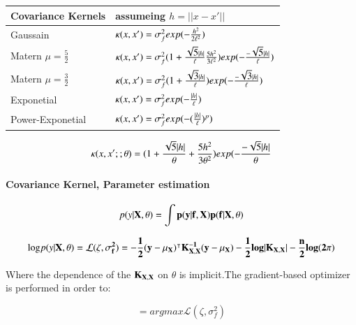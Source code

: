 \documentclass[]{elsarticle} %
\begin{document}
\begin{tabu} to 
\toprule
Covariance Kernels & assumeing $h=||x-x'||$\\
\midrule
Gaussain & $\Large \kappa (x,x') =\sigma_f^2 exp(-\frac{h^2}{2\ell^2})$\\
Matern $\mu=\frac{5}{2}$ & $\Large \kappa (x,x') =\sigma_f^2(1 + \frac{\sqrt{5}|h|}{\ell}\frac{5h^2}{3\ell^2})exp(-\frac{ -\sqrt{5}|h|}{\ell})$\\
Matern $\mu=\frac{3}{2}$ & $\Large \kappa (x,x') =\sigma_f^2(1 + \frac{\sqrt{3}|h|}{\ell})exp(-\frac{-\sqrt{3}|h|}{\ell})$\\
Exponetial & $\Large \kappa (x,x') =\sigma_f^2 exp(-\frac{|h|}{\ell})$\\
Power-Exponetial & $\Large \kappa (x,x') =\sigma_f^2 exp(-(\frac{|h|}{\ell})^p)$\\
\bottomrule
\end{tabu}

\begin{equation}
{\Large \kappa} (x,x'; ;\theta) = (1 + \frac{\sqrt{5}|h|}{\theta} + \frac{5h^2}{3\theta^2})exp(-\frac{-\sqrt{5}|h|}{\theta}
\label{eq:pred_fun1}
\end{equation}

\hypertarget{covariance-kernel-parameter-estimation}{%
\paragraph{Covariance Kernel, Parameter estimation}\label{covariance-kernel-parameter-estimation}}

\begin{equation}
p(y|\bf{X,\theta}) = \int p(y|\bf{f,X})p(f|\bf{X,\theta})
\label{eq:lig_int}
\end{equation}

\begin{equation}
\text{log} p(y|\bf{X,\theta})=\mathcal{L}(\zeta,\sigma_f^2)=-\frac{1}{2}(y-\mu_X)^{\intercal}\mathbf{K}_{X,X}^{-1}(y-\mu_X)-\frac{1}{2}log|K_{X,X}|-\frac{n}{2}log(2\pi)
\label{eq:log_like}
\end{equation}

Where the dependence of the \(\bf{K}_{X,X}\) on \(\theta\) is implicit.The
gradient-based optimizer is performed in order to:

\begin{equation}
[\zeta^\ast, \sigma_f^{2\ast}]=argmax\mathcal{L}(\zeta,\sigma^2_f)
\label{eq:log_like_opt}
\end{equation}
\end{document}
